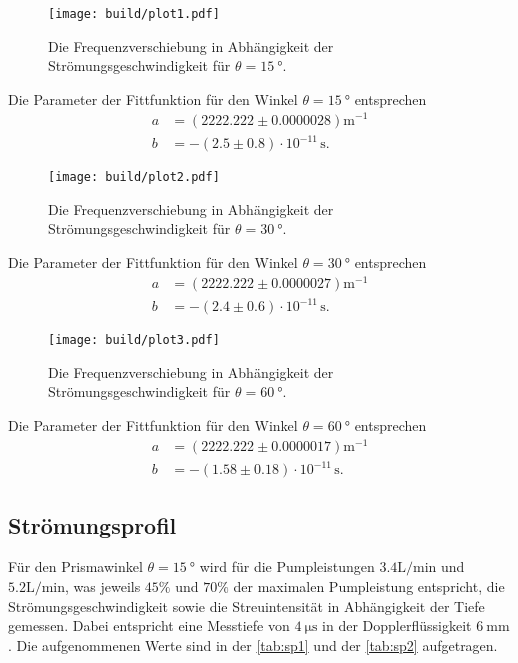 \begin{figure}[H]
	\texttt{[image: build/plot1.pdf]}
	\captionsetup{width=0.765\linewidth}
	\caption{Die Frequenzverschiebung in Abhängigkeit der Strömungsgeschwindigkeit für $\theta = \qty{15}{°}$.}
	\label{fig:plot1}
\end{figure}
Die Parameter der Fittfunktion für den Winkel $\theta = \qty{15}{°}$ entsprechen
\begin{align*}
  a &= (2222.222 \pm 0.0000028) \mathrm{m}^{-1}\\
  b &= -(2.5\pm 0.8) \cdot 10^{-11}\,\mathrm{s}.
\end{align*}
\begin{figure}[H]
	\texttt{[image: build/plot2.pdf]}
	\captionsetup{width=0.765\linewidth}
	\caption{Die Frequenzverschiebung in Abhängigkeit der Strömungsgeschwindigkeit für $\theta = \qty{30}{°}$.}
	\label{fig:plot2}
\end{figure}
Die Parameter der Fittfunktion für den Winkel $\theta = \qty{30}{°}$ entsprechen
\begin{align*}
  a &= (2222.222 \pm 0.0000027) \mathrm{m}^{-1}\\
  b &= -(2.4\pm 0.6) \cdot 10^{-11}\,\mathrm{s}.
\end{align*}
\begin{figure}[H]
	\texttt{[image: build/plot3.pdf]}
	\captionsetup{width=0.765\linewidth}
	\caption{Die Frequenzverschiebung in Abhängigkeit der Strömungsgeschwindigkeit für $\theta = \qty{60}{°}$.}
	\label{fig:plot3}
\end{figure}
Die Parameter der Fittfunktion für den Winkel $\theta = \qty{60}{°}$ entsprechen
\begin{align*}
  a &= (2222.222 \pm 0.0000017) \mathrm{m}^{-1}\\
  b &= -(1.58\pm 0.18) \cdot 10^{-11}\,\mathrm{s}.
\end{align*}
\subsection{Strömungsprofil}
\label{sec:Strömungsprofil}

Für den Prismawinkel $\theta = \qty{15}{°}$ wird für die Pumpleistungen $ 3.4 \si{\liter\per\minute}$ und $ 5.2 \si{\liter\per\minute}$, was jeweils
$45\%$  und $70\%$ der maximalen Pumpleistung entspricht, die Strömungsgeschwindigkeit sowie die Streuintensität in Abhängigkeit der Tiefe gemessen.
Dabei entspricht eine Messtiefe von $\qty{4}{\micro\second}$ in der Dopplerflüssigkeit $\qty{6}{\milli\meter}$.
Die aufgenommenen Werte sind in der \autoref{tab:sp1} und der \autoref{tab:sp2} aufgetragen.

